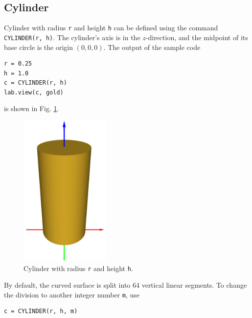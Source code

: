 \subsection{Cylinder}

Cylinder with radius {\tt r} and height {\tt h} can be defined using 
the command {\tt CYLINDER(r, h)}. The cylinder's axis is in 
the $z$-direction, and the midpoint of its base circle is the 
origin $(0, 0, 0)$. The output of the sample code\\

\begin{bbox}
\begin{verbatim}
r = 0.25
h = 1.0
c = CYLINDER(r, h)
lab.view(c, gold)
\end{verbatim}
\end{bbox}
\vspace{6mm}

\noindent
is shown in Fig. \ref{fig:cyl-1}.

\begin{figure}[!ht]
\begin{center}
\includegraphics[width=0.4\textwidth]{img/cyl-1.png}
\end{center}
\vspace{-4mm}
\caption{Cylinder with radius {\tt r} and height {\tt h}.}
\label{fig:cyl-1}
\end{figure}
\noindent
By default, the curved surface is split into 64 vertical linear segments. To 
change the division to another integer number {\tt m}, use\\

\begin{bbox}
\begin{verbatim}
c = CYLINDER(r, h, m)
\end{verbatim}
\end{bbox}
\vspace{6mm}

